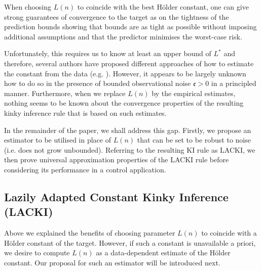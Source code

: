 \documentclass{article} %
\theoremstyle{definition}
\theoremstyle{remark}
\newcommand{\nat}{\mathbb N}
\newcommand{\hexp}{{ \alpha }}%
\newcommand{\obserr}{\mathfrak e} %
\newcommand{\seq}[2]{\ensuremath{\bigl(#1\bigr)_{#2}}}
\begin{document}


When choosing $L(n)$ to coincide with the best H\"older constant, one can give strong guarantees of convergence to the target as on the tightness of the prediction bounds  \cite{Sukharev1978,calliess2014_thesis} showing that bounds are as tight as possible without imposing additional assumptions and that the predictor minimises the worst-case risk.

Unfortunately, this requires us to know at least an upper bound of $L^*$ and therefore, several authors have proposed different approaches of how to estimate the constant from the data (e.g. \cite{Strongin1973,Wood1996}). However, it appears to be largely unknown how to do so in the presence of bounded observational noise $\obserr >0$ in a principled manner. Furthermore, when we replace $L(n)$ by the empirical estimates, nothing seems to be known about the convergence properties of the resulting kinky inference rule that is based on such  estimates.  

In the remainder of the paper, we shall address this gap. Firstly, we propose an estimator to be utilised in place of $L(n)$ that can be set to be robust to noise (i.e. does not grow unbounded). Referring to the resulting KI rule as LACKI, we then prove universal approximation properties of the LACKI rule before considering its performance in a control application.


\subsection{Lazily Adapted Constant Kinky Inference (LACKI)}
\label{sec:lacki}
Above we explained the benefits of choosing parameter $L(n)$ to coincide with a H\"older constant of the target. 
However, if such a constant is unavailable a priori, we desire to compute $L(n)$ as a data-dependent estimate of the H\"older constant. Our proposal for such an estimator will be introduced next. 
\end{document}
